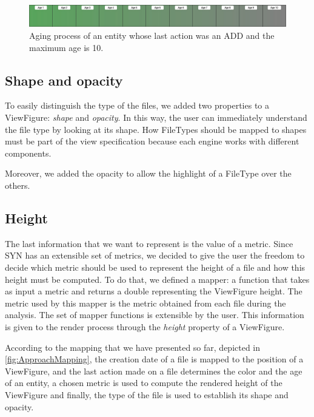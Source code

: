 \begin{figure}
    \center
    \includegraphics[width=\textwidth]{Aging.jpg}
    \caption{Aging process of an entity whose last action was an ADD and the maximum age is 10. }
    \label{fig:Aging}
\end{figure}



\subsection*{Shape and opacity}
To easily distinguish the type of the files, we added two properties to a ViewFigure: \textit{shape} and \textit{opacity}. 
In this way, the user can immediately understand the file type by looking at its shape. How FileTypes should be mapped to shapes must be part of the view specification because each engine works with different components. 

Moreover, we added the opacity to allow the highlight of a FileType over the others. 

\subsection*{Height}
The last information that we want to represent is the value of a metric. Since SYN has an extensible set of metrics, we decided to give the user the freedom to decide which metric should be used to represent the height of a file and how this height must be computed. 
To do that, we defined a mapper: a function that takes as input a metric and returns a double representing the ViewFigure height. The metric used by this mapper is the metric obtained from each file during the analysis. The set of mapper functions is extensible by the user. \bigbreak
This information is given to the render process through the \textit{height} property of a ViewFigure.

According to the mapping that we have presented so far, depicted in \autoref{fig:ApproachMapping}, the creation date of a file is mapped to the position of a ViewFigure, and the last action made on a file determines the color and the age of an entity, a chosen metric is used to compute the rendered height of the ViewFigure and finally, the type of the file is used to establish its shape and opacity. 


